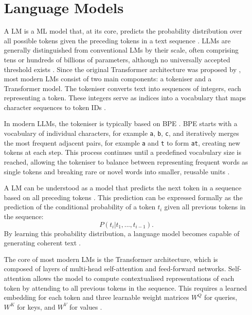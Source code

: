 \documentclass[a4paper,oneside,bibliography=totoc]{scrbook}
\begin{document}
\section{Language Models}
\label{sec:language_models}

A \ac{LM} is a \ac{ML} model that, at its core, predicts the probability distribution over all possible tokens given the preceding tokens in a text sequence \cite{Radford2019}. \Acp{LLM} are generally distinguished from conventional \acp{LM} by their scale, often comprising tens or hundreds of billions of parameters, although no universally accepted threshold exists \cite{Zhao2025}. Since the original Transformer architecture was proposed by \citet{Vaswani2023}, most modern \acp{LM} consist of two main components: a tokeniser and a Transformer model. The tokeniser converts text into sequences of integers, each representing a token. These integers serve as indices into a vocabulary that maps character sequences to token IDs \cite{Sennrich2016}.

In modern \acp{LLM}, the tokeniser is typically based on \ac{BPE} \cite{Radford2019}. \Ac{BPE} starts with a vocabulary of individual characters, for example \texttt{a}, \texttt{b}, \texttt{c}, and iteratively merges the most frequent adjacent pairs, for example \texttt{a} and \texttt{t} to form \texttt{at}, creating new tokens at each step. This process continues until a predefined vocabulary size is reached, allowing the tokeniser to balance between representing frequent words as single tokens and breaking rare or novel words into smaller, reusable units \cite{Sennrich2016}.

A \ac{LM} can be understood as a model that predicts the next token in a sequence based on all preceding tokens \cite{Radford2019}. This prediction can be expressed formally as the prediction of the conditional probability of a token $t_i$ given all previous tokens in the sequence:
\begin{equation}
  P(t_i|t_1, ..., t_{i-1}).
\end{equation}
By learning this probability distribution, a language model becomes capable of generating coherent text \cite{Radford2019,Brown2020}.

The core of most modern \acp{LM} is the Transformer architecture, which is composed of layers of multi-head self-attention and feed-forward networks. Self-attention allows the model to compute contextualised representations of each token by attending to all previous tokens in the sequence. This requires a learned embedding for each token and three learnable weight matrices $W^Q$ for queries, $W^K$ for keys, and $W^V$ for values \cite{Vaswani2023}.
\end{document}

